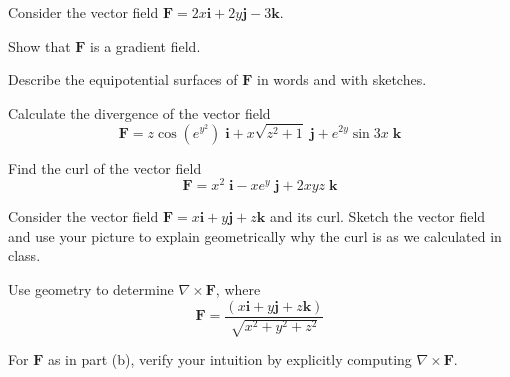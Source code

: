 \documentclass[boxes]{gsypset}
\begin{document}
\begin{problem}[3.3.24]
	Consider the vector field
	$\mathbf{F}=2x\mathbf{i}+2y\mathbf{j}-3\mathbf{k}$.
	\begin{subproblems}
		\subproblem
			Show that $\mathbf{F}$ is a gradient field.
			\begin{solution}
				
			\end{solution}
		\subproblem 
			Describe the equipotential surfaces of $\mathbf{F}$ in words and with sketches.
			\begin{solution}
				
			\end{solution}
	\end{subproblems}
\end{problem}

\begin{problem}[3.4.4]
	Calculate the divergence of the vector field
	\[
		\mathbf{F} = z\cos\left(e^{y^2}\right)\;\mathbf{i} + 
		             x\sqrt{z^2+1}\;\mathbf{j} + 
		             e^{2y}\sin3x\;\mathbf{k}
	\]
\end{problem}
\begin{solution}
	
\end{solution}

\begin{problem}[3.4.7]
	Find the curl of the vector field
	\[
		\mathbf{F} = x^2\;\mathbf{i} - xe^y\;\mathbf{j} + 2xyz\;\mathbf{k}
	\]
\end{problem}
\begin{solution}
	
\end{solution}

\begin{problem}[3.4.12]
	\begin{subproblems}
		\subproblem 
			Consider the vector field 
			$\mathbf{F} = x\mathbf{i} + y\mathbf{j} + z\mathbf{k}$ and its curl. 
			Sketch the vector field and use your picture to explain 
			geometrically why the curl is as we calculated in class.
			\begin{solution}
				
			\end{solution}
		\subproblem
			Use geometry to determine $\nabla\times\mathbf{F}$, where
			\[
				\mathbf{F} = \frac{(x\mathbf{i}+ y\mathbf{j} +z\mathbf{k})}{\sqrt{x^2+y^2+z^2}}
			\]
			\begin{solution}
				
			\end{solution}
		\subproblem
			For $\mathbf{F}$ as in part (b), verify your intuition by explicitly computing 
			$\nabla\times\mathbf{F}$.
			\begin{solution}
				
			\end{solution}
	\end{subproblems}
\end{problem}
\end{document}
